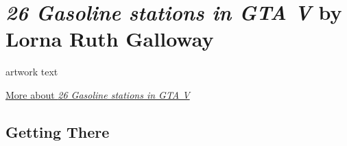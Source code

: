\documentclass[
  openany]{book}
\begin{document}
\hypertarget{gasoline-stations-in-gta-v-by-lorna-ruth-galloway}{%
\section*{\texorpdfstring{\emph{26 Gasoline stations in GTA V} by Lorna Ruth Galloway}{26 Gasoline stations in GTA V by Lorna Ruth Galloway}}\label{gasoline-stations-in-gta-v-by-lorna-ruth-galloway}}

artwork text

\href{https://www.lornaruthgalloway.com/charcoal-halftone}{More about \emph{26 Gasoline stations in GTA V}}

\hypertarget{getting-there-3}{%
\subsection*{Getting There}\label{getting-there-3}}
\end{document}

